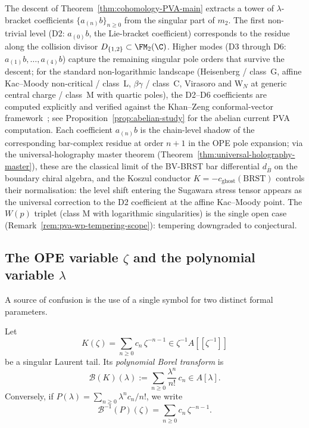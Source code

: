 \begin{remark}
\label{rem:pva-d2-d6-status}
The descent of Theorem~\ref{thm:cohomology-PVA-main} extracts a tower of
$\lambda$-bracket coefficients $\{a_{(n)}b\}_{n \ge 0}$ from the singular
part of $m_2$. The first non-trivial level (D2: $a_{(0)}b$, the Lie-bracket
coefficient) corresponds to the residue along the collision divisor
$D_{\{1,2\}}\subset \FM_2(\C)$. Higher modes (D3 through D6: $a_{(1)}b,
\ldots, a_{(4)}b$) capture the remaining singular pole orders that survive
the descent; for the standard non-logarithmic landscape (Heisenberg / class~G,
affine Kac--Moody non-critical / class~L, $\beta\gamma$ / class~C, Virasoro
and W$_N$ at generic central charge / class~M with quartic poles), the D2--D6
coefficients are computed explicitly and verified against the Khan--Zeng
conformal-vector framework~\cite{KZ25}; see Proposition~\ref{prop:abelian-study}
for the abelian current PVA computation. Each coefficient $a_{(n)}b$ is the
chain-level shadow of the corresponding bar-complex residue at order
$n+1$ in the OPE pole expansion; via the universal-holography master
theorem (Theorem~\ref{thm:universal-holography-master}), these are the
classical limit of the BV-BRST bar differential $d_{\overline B}$ on
the boundary chiral algebra, and the Koszul conductor
$K = -c_{\mathrm{ghost}}(\mathrm{BRST})$ controls their normalisation:
the level shift entering the Sugawara stress tensor appears as the
universal correction to the D2 coefficient at the affine Kac--Moody
point. The $W(p)$ triplet (class M with logarithmic singularities) is
the single open case (Remark~\ref{rem:pva-wp-tempering-scope}):
tempering downgraded to conjectural.
\end{remark}

\subsection{The OPE variable $\zeta$ and the polynomial variable $\lambda$}

A source of confusion is the use of a single symbol for two distinct
formal parameters.

\begin{definition}
\label{def:borel-transform-pva}
Let
\[
K(\zeta)=\sum_{n\ge0} c_n\,\zeta^{-n-1}\in \zeta^{-1}A[\![\zeta^{-1}]\!]
\]
be a singular Laurent tail. Its \emph{polynomial Borel transform} is
\[
\mathcal B(K)(\lambda):=\sum_{n\ge0}\frac{\lambda^n}{n!}\,c_n\in A[\lambda].
\]
Conversely, if $P(\lambda)=\sum_{n\ge0}\lambda^n c_n/n!$, we write
\[
\mathcal B^{-1}(P)(\zeta)=\sum_{n\ge0} c_n\,\zeta^{-n-1}.
\]
\end{definition}

